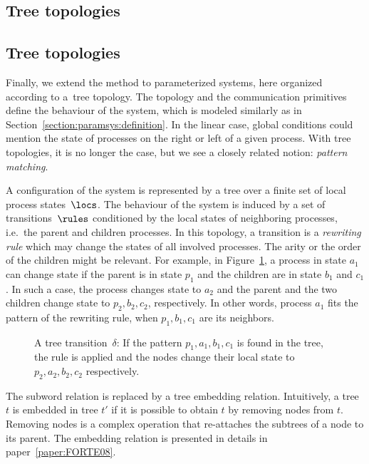 \makeatletter
\if@UU@margnum
\subsection*{Tree topologies}
\else
\subsection{Tree topologies}
\fi
\makeatother

Finally, we extend the method to parameterized systems, here organized
according to a~tree topology.
%
The topology and the communication primitives define the behaviour of
the system, which is modeled similarly as in
Section~\ref{section:paramsys:definition}.
%
In the linear case, global conditions could mention the state of
processes on the right or left of a given process.
%
With tree topologies, it is no longer the case, but we see a closely
related notion: \emph{pattern matching}.

A configuration of the system is represented by a tree over a finite
set of local process states~$\locs$.
%
The behaviour of the system is induced by a set of
transitions~$\rules$ conditioned by the local states of neighboring
processes, i.e.\ the parent and children processes.
%
In this topology, a transition is a \emph{rewriting rule} which may
change the states of all involved processes. %
The arity or the order of the children might be relevant.
%
For example, in Figure~\ref{figure:tree:transition}, a process in
state $a_1$ can change state if the parent is in state $p_1$ and the
children are in state $b_1$ and $c_1$.
%
In such a case, the process changes state to $a_2$ and the parent and
the two children change state to $p_2,b_2,c_2$, respectively.
%
In other words, process $a_1$ fits the pattern of the rewriting rule,
when $p_1,b_1,c_1$ are its neighbors.

\begingroup%
\setlength\intextsep{\dazintextsep}
\begin{figure}[ht]
  \centering
  \caption{A tree transition~$\delta$: If the pattern
    $p_1,a_1,b_1,c_1$ is found in the tree, the rule is applied and
    the nodes change their local state to $p_2,a_2,b_2,c_2$
    respectively.}
  \label{figure:tree:transition}
\end{figure}
\endgroup

The subword relation is replaced by a tree embedding
relation. Intuitively, a tree $t$ is embedded in tree $t'$ if it is
possible to obtain $t$ by removing nodes from $t$. Removing nodes is a
complex operation that \mbox{re-attaches} the subtrees of a node to
its parent.  The embedding relation is presented in details in
paper~\ref{paper:FORTE08}.

